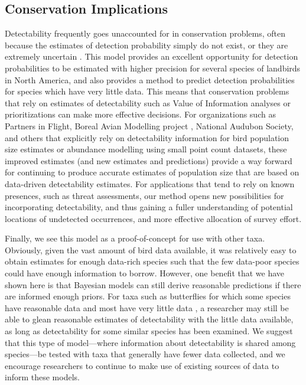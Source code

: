 \documentclass[12pt]{article}
\begin{document}
\subsection{Conservation Implications}
\par Detectability frequently goes unaccounted for in conservation problems, often because the estimates of detection probability simply do not exist, or they are extremely uncertain \citep{bennett_how_2024}.
This model provides an excellent opportunity for detection probabilities to be estimated with higher precision for several species of landbirds in North America, and also provides a method to predict detection probabilities for species which have very little data. 
This means that conservation problems that rely on estimates of detectability such as Value of Information analyses \citep{canessa_when_2015, bennett_when_2018} or prioritizations \citep{hanson_prioritizr_2022} can make more effective decisions.
For organizations such as Partners in Flight, Boreal Avian Modelling project \citep{cumming_toward_2010}, National Audubon Society, and others that explicitly rely on detectability information for bird population size estimates or abundance modelling using small point count datasets, these improved estimates (and new estimates and predictions) provide a way forward for continuing to produce accurate estimates of population size that are based on data-driven detectability estimates.
For applications that tend to rely on known presences, such as threat assessments, our method opens new possibilities for incorporating detectability, and thus gaining a fuller understanding of  potential locations of undetected occurrences, and more effective allocation of survey effort.

\par Finally, we see this model as a proof-of-concept for use with other taxa.
Obviously, given the vast amount of bird data available, it was relatively easy to obtain estimates for enough data-rich species such that the few data-poor species could have enough information to borrow. 
However, one benefit that we have shown here is that Bayesian models can still derive reasonable predictions if there are informed enough priors.
For taxa such as butterflies for which some species have reasonable data and most have very little data \citep{lewthwaite_geographical_2022}, a researcher may still be able to glean reasonable estimates of detectability with the little data available, as long as detectability for some similar species has been examined.
We suggest that this type of model---where information about detectability is shared among species---be tested with taxa that generally have fewer data collected, and we encourage researchers to continue to make use of existing sources of data \citep{binley_minimizing_2023} to inform these models.
\end{document}
